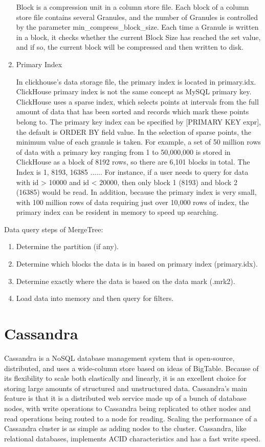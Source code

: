 \begin{enumerate}
    
    Block is a compression unit in a column store file. Each block of a column store file contains several Granules, and the number of Granules is controlled by the parameter min\_compress\_block\_size. Each time a Granule is written in a block, it checks whether the current Block Size has reached the set value, and if so, the current block will be compressed and then written to disk.
    
    \item Primary Index
    
    In clickhouse's data storage file, the primary index is located in primary.idx.
    ClickHouse primary index is not the same concept as MySQL primary key.
    ClickHouse uses a sparse index, which selects points at intervals from the full amount of data that has been sorted and records which mark these points belong to. The primary key index can be specified by [PRIMARY KEY expr], the default is ORDER BY field value. In the selection of sparse points, the minimum value of each granule is taken. For example, a set of 50 million rows of data with a primary key ranging from 1 to 50,000,000 is stored in ClickHouse as a block of 8192 rows, so there are 6,101 blocks in total. The Index is 1, 8193, 16385 ......
    For instance, if a user needs to query for data with id > 10000 and id < 20000, then only block 1 (8193) and block 2 (16385) would be read. In addition, because the primary index is very small, with 100 million rows of data requiring just over 10,000 rows of index, the primary index can be resident in memory to speed up searching.
    
    
\end{enumerate}
Data query steps of MergeTree:
\begin{enumerate}
    \item Determine the partition (if any).
    \item Determine which blocks the data is in based on primary index (primary.idx).
    \item Determine exactly where the data is based on the data mark (.mrk2).
    \item Load data into memory and then query for filters.
\end{enumerate}

\section{Cassandra}

Cassandra is a NoSQL database management system that is open-source, distributed, and uses a wide-column store based on ideas of BigTable\cite{10.1145/1365815.1365816}. Because of its flexibility to scale both elastically and linearly, it is an excellent choice for storing large amounts of structured and unstructured data. Cassandra's main feature is that it is a distributed web service made up of a bunch of database nodes, with write operations to Cassandra being replicated to other nodes and read operations being routed to a node for reading. Scaling the performance of a Cassandra cluster is as simple as adding nodes to the cluster. Cassandra, like relational databases, implements ACID characteristics and has a fast write speed\cite{7507966}.

